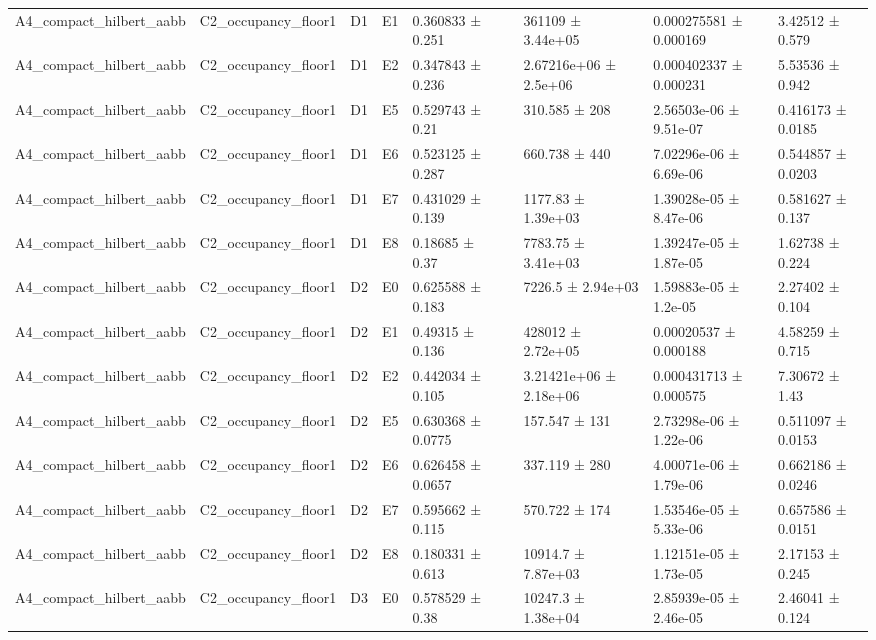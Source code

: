 \begin{table}
\begin{tabular}{lllllllll}
A4\_compact\_hilbert\_aabb & C2\_occupancy\_floor1 & D1 & E1 & 0.360833 ± 0.251 &  & 361109 ± 3.44e+05 & 0.000275581 ± 0.000169 & 3.42512 ± 0.579 \\
A4\_compact\_hilbert\_aabb & C2\_occupancy\_floor1 & D1 & E2 & 0.347843 ± 0.236 &  & 2.67216e+06 ± 2.5e+06 & 0.000402337 ± 0.000231 & 5.53536 ± 0.942 \\
A4\_compact\_hilbert\_aabb & C2\_occupancy\_floor1 & D1 & E5 & 0.529743 ± 0.21 &  & 310.585 ± 208 & 2.56503e-06 ± 9.51e-07 & 0.416173 ± 0.0185 \\
A4\_compact\_hilbert\_aabb & C2\_occupancy\_floor1 & D1 & E6 & 0.523125 ± 0.287 &  & 660.738 ± 440 & 7.02296e-06 ± 6.69e-06 & 0.544857 ± 0.0203 \\
A4\_compact\_hilbert\_aabb & C2\_occupancy\_floor1 & D1 & E7 & 0.431029 ± 0.139 &  & 1177.83 ± 1.39e+03 & 1.39028e-05 ± 8.47e-06 & 0.581627 ± 0.137 \\
A4\_compact\_hilbert\_aabb & C2\_occupancy\_floor1 & D1 & E8 & 0.18685 ± 0.37 &  & 7783.75 ± 3.41e+03 & 1.39247e-05 ± 1.87e-05 & 1.62738 ± 0.224 \\
A4\_compact\_hilbert\_aabb & C2\_occupancy\_floor1 & D2 & E0 & 0.625588 ± 0.183 &  & 7226.5 ± 2.94e+03 & 1.59883e-05 ± 1.2e-05 & 2.27402 ± 0.104 \\
A4\_compact\_hilbert\_aabb & C2\_occupancy\_floor1 & D2 & E1 & 0.49315 ± 0.136 &  & 428012 ± 2.72e+05 & 0.00020537 ± 0.000188 & 4.58259 ± 0.715 \\
A4\_compact\_hilbert\_aabb & C2\_occupancy\_floor1 & D2 & E2 & 0.442034 ± 0.105 &  & 3.21421e+06 ± 2.18e+06 & 0.000431713 ± 0.000575 & 7.30672 ± 1.43 \\
A4\_compact\_hilbert\_aabb & C2\_occupancy\_floor1 & D2 & E5 & 0.630368 ± 0.0775 &  & 157.547 ± 131 & 2.73298e-06 ± 1.22e-06 & 0.511097 ± 0.0153 \\
A4\_compact\_hilbert\_aabb & C2\_occupancy\_floor1 & D2 & E6 & 0.626458 ± 0.0657 &  & 337.119 ± 280 & 4.00071e-06 ± 1.79e-06 & 0.662186 ± 0.0246 \\
A4\_compact\_hilbert\_aabb & C2\_occupancy\_floor1 & D2 & E7 & 0.595662 ± 0.115 &  & 570.722 ± 174 & 1.53546e-05 ± 5.33e-06 & 0.657586 ± 0.0151 \\
A4\_compact\_hilbert\_aabb & C2\_occupancy\_floor1 & D2 & E8 & 0.180331 ± 0.613 &  & 10914.7 ± 7.87e+03 & 1.12151e-05 ± 1.73e-05 & 2.17153 ± 0.245 \\
A4\_compact\_hilbert\_aabb & C2\_occupancy\_floor1 & D3 & E0 & 0.578529 ± 0.38 &  & 10247.3 ± 1.38e+04 & 2.85939e-05 ± 2.46e-05 & 2.46041 ± 0.124 \\

\end{tabular}
\end{table}
